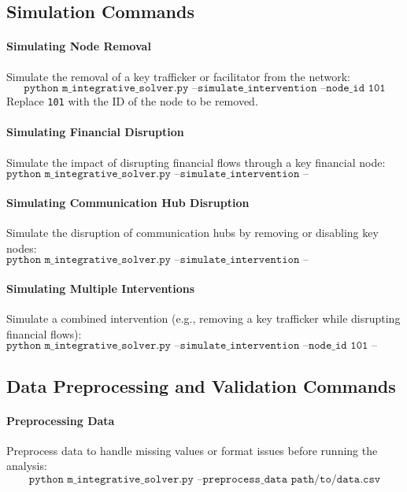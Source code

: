 \documentclass[%
 preprint, linenumbers,
 amsmath,amssymb,
 aps, physrev,
]{revtex4-2}
\begin{document}
\subsection*{Simulation Commands}

\paragraph{Simulating Node Removal}
Simulate the removal of a key trafficker or facilitator from the network:
\[
\texttt{python m\_integrative\_solver.py --simulate\_intervention --node\_id 101}
\]
Replace \texttt{101} with the ID of the node to be removed.

\paragraph{Simulating Financial Disruption}
Simulate the impact of disrupting financial flows through a key financial node:
\[
\texttt{python m\_integrative\_solver.py --simulate\_intervention --disrupt\_financial --node\_id 205}
\]

\paragraph{Simulating Communication Hub Disruption}
Simulate the disruption of communication hubs by removing or disabling key nodes:
\[
\texttt{python m\_integrative\_solver.py --simulate\_intervention --disrupt\_communication --node\_id 310}
\]

\paragraph{Simulating Multiple Interventions}
Simulate a combined intervention (e.g., removing a key trafficker while disrupting financial flows):
\[
\texttt{python m\_integrative\_solver.py --simulate\_intervention --node\_id 101 --disrupt\_financial --node\_id 205}
\]

\subsection*{Data Preprocessing and Validation Commands}

\paragraph{Preprocessing Data}
Preprocess data to handle missing values or format issues before running the analysis:
\[
\texttt{python m\_integrative\_solver.py --preprocess\_data path/to/data.csv}
\]
\end{document}
